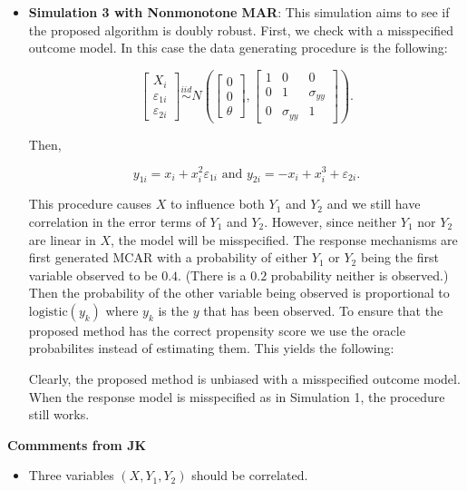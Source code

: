 \documentclass[12pt]{article}
\newcommand{\logistic}{{\text{logistic}}}
\begin{document}
\begin{itemize}
    
    
    

    \newpage

  \item \textbf{Simulation 3 with Nonmonotone MAR}:
    This simulation aims to see if the proposed algorithm is doubly robust.
    First, we check with a misspecified outcome model. In this case the data
    generating procedure is the following:

    \[\begin{bmatrix}
    X_i \\ \varepsilon_{1i} \\ \varepsilon_{2i}
    \end{bmatrix} \stackrel{iid}{\sim}
    N\left(
    \begin{bmatrix}
        0 \\ 0 \\ \theta
    \end{bmatrix},
    \begin{bmatrix}
        1 & 0 & 0 \\
        0 & 1 & \sigma_{yy}\\
        0 & \sigma_{yy} & 1
    \end{bmatrix}
    \right).\]

    Then, 

    \[y_{1i} = x_i + x_i^2 \varepsilon_{1i} \text{ and } 
    y_{2i} = -x_i + x_i^3 + \varepsilon_{2i}.\]

    This procedure causes $X$ to influence both $Y_1$ and $Y_2$ and we still
    have correlation in the error terms of $Y_1$ and $Y_2$. However, since
    neither $Y_1$ nor $Y_2$ are linear in $X$, the model will be misspecified.
    The response mechanisms are first generated MCAR with a probability of
    either $Y_1$ or $Y_2$ being the first variable observed to be $0.4$. (There
    is a $0.2$ probability neither is observed.) Then the probability of the
    other variable being observed is proportional to $\logistic(y_k)$ where
    $y_k$ is the $y$ that has been observed. To ensure that the proposed method
    has the correct propensity score we use the oracle probabilites instead of
    estimating them. This yields the following:

    
    
    

    \newpage

    Clearly, the proposed method is unbiased with a misspecified outcome model.
    When the response model is misspecified as in Simulation 1, the procedure
    still works.

\end{itemize}


{\bf Commments from JK}
\begin{itemize}
    \item Three variables $(X, Y_1, Y_2)$ should be correlated. 
\end{itemize}

\newpage

\printbibliography
\end{document}
